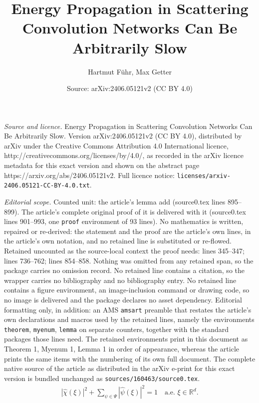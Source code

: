 \documentclass[10pt,a4paper]{amsart}
\title{Energy Propagation in Scattering Convolution Networks Can Be Arbitrarily Slow}
\author{Hartmut F\"uhr, Max Getter}
\date{Source: arXiv:2406.05121v2 (CC BY 4.0)}
\newcommand{\R}{{\mathbb{R}}}
\begin{document}
\maketitle

\noindent\emph{Source and licence.} Energy Propagation in Scattering Convolution Networks Can Be Arbitrarily Slow. Version arXiv:2406.05121v2 (CC BY 4.0), distributed by arXiv under the Creative Commons Attribution 4.0 International licence, http://creativecommons.org/licenses/by/4.0/, as recorded in the arXiv licence metadata for this exact version and shown on the abstract page https://arxiv.org/abs/2406.05121v2. Full licence notice: \texttt{licenses/arxiv-2406.05121-CC-BY-4.0.txt}.\par\smallskip

\noindent\textit{Editorial scope.} Counted unit: the article's lemma add (source0.tex lines 895--899). The article's complete original proof of it is delivered with it (source0.tex lines 901--993, one \texttt{proof} environment of 93 lines). No mathematics is written, repaired or re-derived: the statement and the proof are the article's own lines, in the article's own notation, and no retained line is substituted or re-flowed.  Retained uncounted as the source-local context the proof needs: lines 345--347; lines 736--762; lines 854--858.  Nothing was omitted from any retained span, so the package carries no omission record.  No retained line contains a citation, so the wrapper carries no bibliography and no bibliography entry.  No retained line contains a figure environment, an image-inclusion command or drawing code, so no image is delivered and the package declares no asset dependency.  Editorial formatting only, in addition: an AMS \texttt{amsart} preamble that restates the article's own declarations and macros used by the retained lines, namely the environments \texttt{theorem}, \texttt{myenum}, \texttt{lemma} on separate counters, together with the standard packages those lines need.  The retained environments print in this document as Theorem 1, Myenum 1, Lemma 1 in order of appearance, whereas the article prints the same items with the numbering of its own full document.  The complete native source of the article as distributed in the arXiv e-print for this exact version is bundled unchanged as \texttt{sources/160463/source0.tex}.
  \begin{align}\label{ass: Littlewood-Paley condition}
    |\widehat{\chi}(\xi)|^2+\sum_{\psi \in \Psi} |\widehat{\psi}(\xi)|^2=1 \quad \text{a.e. } \xi \in \R^d.
  \end{align}
\end{document}
